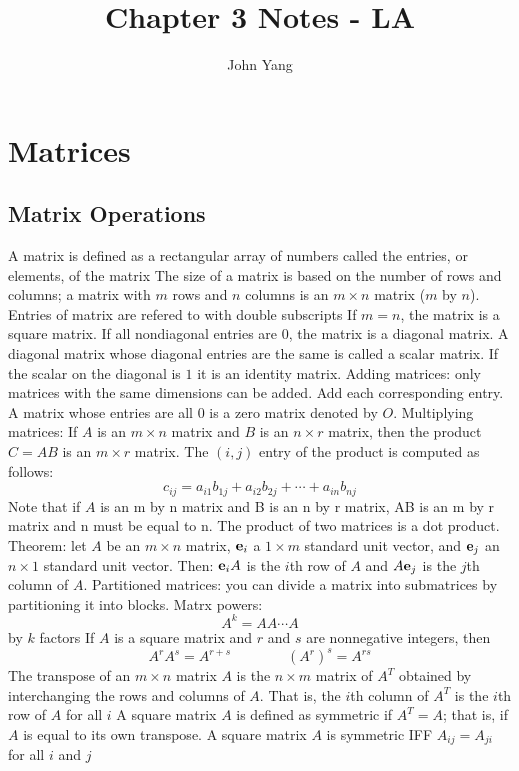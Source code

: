 \documentclass{article}
\title{Chapter 3 Notes - LA} %
\author{John Yang}
\begin{document}
    \maketitle
    \tableofcontents
    \section{Matrices} %
    \subsection{Matrix Operations} %
    \begin{outline}
        \1 A matrix is defined as a rectangular array of numbers called the entries, or elements, of the matrix 
        \1 The size of a matrix is based on the number of rows and columns; a matrix with $m$ rows and $n$ columns is an $m \times n$ matrix ($m$ by $n$). 
        \1 Entries of matrix are refered to with double subscripts
        \1 If $m=n$, the matrix is a square matrix. If all nondiagonal entries are $0$, the matrix is a diagonal matrix. A diagonal matrix whose diagonal entries are the same is called a scalar matrix. If the scalar on the diagonal is $1$ it is an identity matrix. 
        \1 Adding matrices: only matrices with the same dimensions can be added. Add each corresponding entry. 
        \1 A matrix whose entries are all 0 is a zero matrix denoted by $O$. 
        \1 Multiplying matrices: If $A$ is an \(m\times n\) matrix and $B$ is an \(n\times r\) matrix, then the product \(C=AB\) is an \(m\times r\) matrix. The \((i,j)\) entry of the product is computed as follows: \[c_{ij}=a_{i1}b_{1j}+a_{i2}b_{2j}+\cdots+a_{in}b_{nj}\]
        \1 Note that if $A$ is an m by n matrix and B is an n by r matrix, AB is an m by r matrix and n must be equal to n. 
        \1 The product of two matrices is a dot product. 
        \1 Theorem: let $A$ be an \(m\times n\) matrix, \(\vb e_i\) a \(1\times m\) standard unit vector, and \(\vb e_j\) an \(n\times 1\) standard unit vector. Then:
            \2 \(\vb e_iA\) is the \(i\)th row of $A$ and 
            \2 \(A\vb e_j\) is the \(j\)th column of $A$. 
        \1 Partitioned matrices: you can divide a matrix into submatrices by partitioning it into blocks. 
        \1 Matrx powers: \[A^k=AA\cdots A\] by $k$ factors
        \1 If $A$ is a square matrix and $r$ and $s$ are nonnegative integers, then \[A^rA^s=A^{r+s}\qquad\qquad(A^r)^s=A^{rs}\]
        \1 The transpose of an \(m\times n\) matrix $A$ is the \(n\times m\) matrix of \(A^T\) obtained by interchanging the rows and columns of $A$. That is, the \(i\)th column of \(A^T\) is the \(i\)th row of $A$ for all $i$
        \1 A square matrix $A$ is defined as symmetric if \(A^T=A\); that is, if $A$ is equal to its own transpose. 
        \1 A square matrix $A$ is symmetric IFF \(A_{ij}=A_{ji}\) for all $i$ and $j$
    
   \end{outline}
\end{document}

